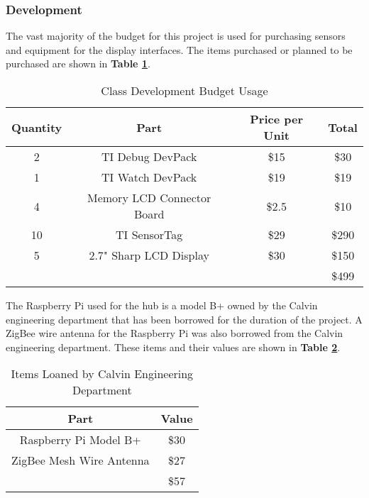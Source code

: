 \documentclass[PPFS.tex]{template/subfiles}
\begin{document}
        \subsubsection{Development}
        The vast majority of the budget for this project is used for purchasing sensors and equipment for the display interfaces. The items purchased or planned to be purchased are shown in \textbf{Table \ref{tab:devPartCost}}.
        \begin{table}[H]
        	\begin{center}
        		\caption{Class Development Budget Usage}
        		\label{tab:devPartCost}
        		\begin{tabular}{|c|c|c|c|}
        			\hline
        			Quantity & Part & Price per Unit & Total\\
        			\hline
        			2 & TI Debug DevPack & \$15 & \$30\\
        			\hline
        			1 & TI Watch DevPack & \$19 & \$19\\
        			\hline
        			4 & Memory LCD Connector Board & \$2.5 & \$10\\
        			\hline
        			10 & TI SensorTag & \$29 & \$290\\
        			\hline
        			5 & 2.7" Sharp LCD Display & \$30 & \$150\\
        			\hline
        			&&& \$499\\
        			\hline
        		\end{tabular}
        	\end{center}
        \end{table}
        
        The Raspberry Pi used for the hub is a model B+ owned by the Calvin engineering department that has been borrowed for the duration of the project. A ZigBee wire antenna for the Raspberry Pi was also borrowed from the Calvin engineering department. These items and their values are shown in \textbf{Table \ref{tab:devLoanedItems}}.
        
        \begin{table}[H]
        	\begin{center}
        		\caption{Items Loaned by Calvin Engineering Department}
        		\label{tab:devLoanedItems}
        		\begin{tabular}{|c|c|}
        			\hline
        			Part & Value\\
        			\hline
        			Raspberry Pi Model B+ & \$30 \\
        			\hline
        			ZigBee Mesh Wire Antenna & \$27 \\
        			\hline
        			& \$57\\
        			\hline
        		\end{tabular}
        	\end{center}
        \end{table}
\end{document}
